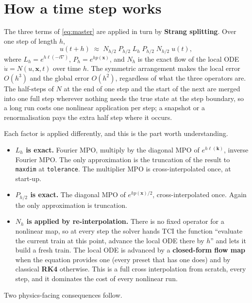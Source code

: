 \documentclass[11pt,a4paper]{article}
\newcommand{\code}[1]{\texttt{#1}}
\newcommand{\vx}{\mathbf{x}}
\newcommand{\vk}{\mathbf{k}}
\begin{document}
\section{How a time step works}
\label{sec:step}

The three terms of \eqref{eq:master} are applied in turn by \textbf{Strang splitting}.
Over one step of length $h$,
\begin{equation}
u(t+h)\;\approx\;N_{h/2}\;P_{h/2}\;L_{h}\;P_{h/2}\;N_{h/2}\;u(t),
\label{eq:strang}
\end{equation}
where $L_h=e^{h\ell(-i\nabla)}$, $P_h=e^{hp(\vx)}$, and $N_h$ is the exact flow of the
local ODE $\dot u=N(u,\vx,t)$ over time $h$. The symmetric arrangement makes the local
error $O(h^3)$ and the global error $O(h^2)$, regardless of what the three operators
are. The half-steps of $N$ at the end of one step and the start of the next are merged
into one full step wherever nothing needs the true state at the step boundary, so a
long run costs one nonlinear application per step; a snapshot or a renormalisation pays
the extra half step where it occurs.

Each factor is applied differently, and this is the part worth understanding.
\begin{itemize}[leftmargin=1.5em]
\item \textbf{$L_h$ is exact.} Fourier MPO, multiply by the diagonal MPO of
  $e^{h\ell(\vk)}$, inverse Fourier MPO. The only approximation is the truncation of the
  result to \code{maxdim} at \code{tolerance}. The multiplier MPO is cross-interpolated
  once, at start-up.
\item \textbf{$P_{h/2}$ is exact.} The diagonal MPO of $e^{hp(\vx)/2}$,
  cross-interpolated once. Again the only approximation is truncation.
\item \textbf{$N_h$ is applied by re-interpolation.} There is no fixed operator for a
  nonlinear map, so at every step the solver hands TCI the function ``evaluate the
  current train at this point, advance the local ODE there by $h$'' and lets it build a
  fresh train. The local ODE is advanced by a \textbf{closed-form flow map} when the
  equation provides one (every preset that has one does) and by classical \textbf{RK4}
  otherwise. This is a full cross interpolation from scratch, every step, and it
  dominates the cost of every nonlinear run.
\end{itemize}

Two physics-facing consequences follow.
\end{document}
